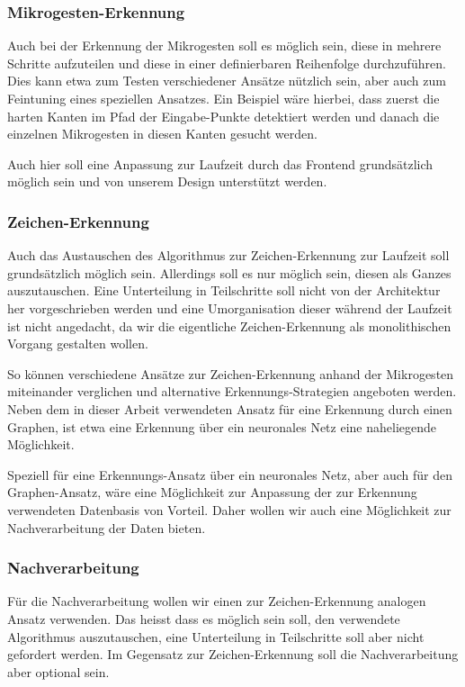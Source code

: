 \subsubsection{Mikrogesten-Erkennung}

Auch bei der Erkennung der Mikrogesten soll es möglich sein, diese in mehrere Schritte aufzuteilen und diese in einer definierbaren Reihenfolge durchzuführen. Dies kann etwa zum Testen verschiedener Ansätze nützlich sein, aber auch zum Feintuning eines speziellen Ansatzes. Ein Beispiel wäre hierbei, dass zuerst die harten Kanten im Pfad der Eingabe-Punkte detektiert werden und danach die einzelnen Mikrogesten in diesen Kanten gesucht werden.

Auch hier soll eine Anpassung zur Laufzeit durch das Frontend grundsätzlich möglich sein und von unserem Design unterstützt werden.

\subsubsection{Zeichen-Erkennung}

Auch das Austauschen des Algorithmus zur Zeichen-Erkennung zur Laufzeit soll grundsätzlich möglich sein. Allerdings soll es nur möglich sein, diesen als Ganzes auszutauschen. Eine Unterteilung in Teilschritte soll nicht von der Architektur her vorgeschrieben werden und eine Umorganisation dieser während der Laufzeit ist nicht angedacht, da wir die eigentliche Zeichen-Erkennung als monolithischen Vorgang gestalten wollen.

So können verschiedene Ansätze zur Zeichen-Erkennung anhand der Mikrogesten miteinander verglichen und alternative Erkennungs-Strategien angeboten werden. Neben dem in dieser Arbeit verwendeten Ansatz für eine Erkennung durch einen Graphen, ist etwa eine Erkennung über ein neuronales Netz eine naheliegende Möglichkeit.

Speziell für eine Erkennungs-Ansatz über ein neuronales Netz, aber auch für den Graphen-Ansatz, wäre eine Möglichkeit zur Anpassung der zur Erkennung verwendeten Datenbasis von Vorteil. Daher wollen wir auch eine Möglichkeit zur Nachverarbeitung der Daten bieten.

\subsubsection{Nachverarbeitung}

Für die Nachverarbeitung wollen wir einen zur Zeichen-Erkennung analogen Ansatz verwenden. Das heisst dass es möglich sein soll, den verwendete Algorithmus auszutauschen, eine Unterteilung in Teilschritte soll aber nicht gefordert werden. Im Gegensatz zur Zeichen-Erkennung soll die Nachverarbeitung aber optional sein.

